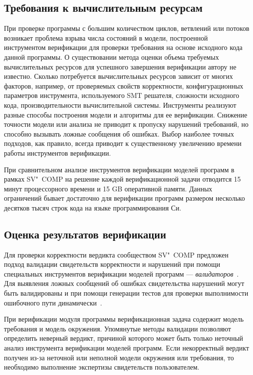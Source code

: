 \subsection{Требования к вычислительным ресурсам}
При проверке программы с большим количеством циклов, ветвлений или потоков возникает проблема взрыва числа состояний в модели, построенной инструментом верификации для проверки требования на основе исходного кода данной программы.
О существовании метода оценки объема требуемых вычислительных ресурсов для успешного завершения верификации автору не известно.
Сколько потребуется вычислительных ресурсов зависит от многих факторов, например, от проверяемых свойств корректности, конфигурационных параметров инструмента, используемого SMT решателя, сложности исходного кода, производительности вычислительной системы.
Инструменты реализуют разные способы построения модели и алгоритмы для ее верификации.
Снижение точности модели или анализа не приводит к пропуску нарушений требований, но способно вызывать ложные сообщения об ошибках. 
Выбор наиболее точных подходов, как правило, всегда приводит к существенному увеличению времени работы инструментов верификации.

При сравнительном анализе инструментов верификации моделей программ в рамках SV"~COMP на решение каждой верификационной задачи отводится 15 минут процессорного времени и 15 GB оперативной памяти.
Данных ограничений бывает достаточно для верификации программ размером несколько десятков тысяч строк кода на языке программирования Си.

\subsection{Оценка результатов верификации}
Для проверки корректности вердикта сообществом SV"~COMP предложен подход валидации свидетельств корректности и нарушений при помощи специальных инструментов верификации моделей программ --- \textit{валидаторов}~\cite{Beyer:2015:WVS,Beyer:2016:CWE}.
Для выявления ложных сообщений об ошибках свидетельства нарушений могут быть валидированы и при помощи генерации тестов для проверки выполнимости ошибочного пути динамически~\cite{Beyer2018TestsFW, Beyer:2004:GTC}.

При верификации модуля программы верификационная задача содержит модель требования и модель окружения.
Упомянутые методы валидации позволяют определить неверный вердикт, причиной которого может быть только неточный анализ инструмента верификации моделей программ.
Если некорректный вердикт получен из-за неточной или неполной модели окружения или требования, то необходимо выполнение экспертизы свидетельств пользователем.

